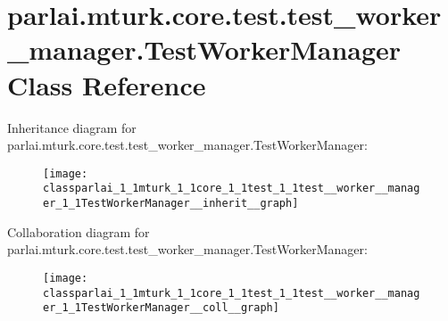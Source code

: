 \hypertarget{classparlai_1_1mturk_1_1core_1_1test_1_1test__worker__manager_1_1TestWorkerManager}{}\section{parlai.\+mturk.\+core.\+test.\+test\+\_\+worker\+\_\+manager.\+Test\+Worker\+Manager Class Reference}
\label{classparlai_1_1mturk_1_1core_1_1test_1_1test__worker__manager_1_1TestWorkerManager}


Inheritance diagram for parlai.\+mturk.\+core.\+test.\+test\+\_\+worker\+\_\+manager.\+Test\+Worker\+Manager\+:
\nopagebreak
\begin{figure}[H]
\begin{center}
\leavevmode
\texttt{[image: classparlai\_1\_1mturk\_1\_1core\_1\_1test\_1\_1test\_\_worker\_\_manager\_1\_1TestWorkerManager\_\_inherit\_\_graph]}
\end{center}
\end{figure}


Collaboration diagram for parlai.\+mturk.\+core.\+test.\+test\+\_\+worker\+\_\+manager.\+Test\+Worker\+Manager\+:
\nopagebreak
\begin{figure}[H]
\begin{center}
\leavevmode
\texttt{[image: classparlai\_1\_1mturk\_1\_1core\_1\_1test\_1\_1test\_\_worker\_\_manager\_1\_1TestWorkerManager\_\_coll\_\_graph]}
\end{center}
\end{figure}
